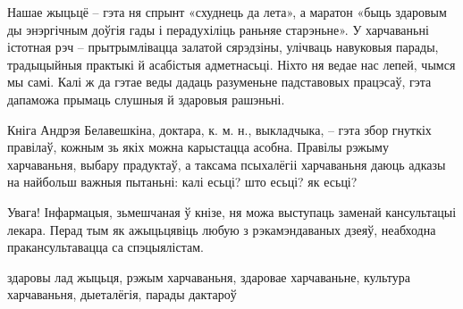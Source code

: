 Нашае жыцьцё – гэта ня спрынт «схуднець да лета», а маратон «быць здаровым ды энэргічным доўгія гады і перадухіліць раньняе старэньне». У харчаваньні істотная рэч – прытрымлівацца залатой сярэдзіны, улічваць навуковыя парады, традыцыйныя практыкі й асабістыя адметнасьці. Ніхто ня ведае нас лепей, чымся мы самі. Калі ж да гэтае веды дадаць разуменьне падставовых працэсаў, гэта дапаможа прымаць слушныя й здаровыя рашэньні.

Кніга Андрэя Белавешкіна, доктара, к. м. н., выкладчыка, – гэта збор гнуткіх правілаў, кожным зь якіх можна карыстацца асобна. Правілы рэжыму харчаваньня, выбару прадуктаў, а таксама псыхалёгіі харчаваньня даюць адказы на найбольш важныя пытаньні: калі есьці? што есьці? як есьці?

Увага! Інфармацыя, зьмешчаная ў кнізе, ня можа выступаць заменай кансультацыі лекара. Перад тым як ажыцьцявіць любую з рэкамэндаваных дзеяў, неабходна пракансультавацца са спэцыялістам.

здаровы лад жыцьця, рэжым харчаваньня, здаровае харчаваньне, культура харчаваньня, дыеталёгія, парады дактароў
